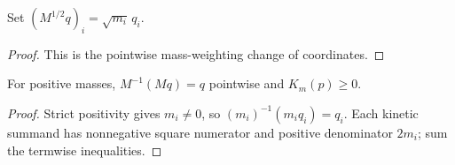 \begin{definition}
\label{def:mass:weighted-coordinate}
Set $(M^{1/2}q)_i=\sqrt{m_i}\,q_i$.
\end{definition}
\begin{proof}This is the pointwise mass-weighting change of coordinates.\end{proof}

\begin{theorem}
\label{thm:physics:mass_matrix:target}
For positive masses, $M^{-1}(Mq)=q$ pointwise and $K_m(p)\ge0$.
\end{theorem}
\begin{proof}
Strict positivity gives $m_i\ne0$, so $(m_i)^{-1}(m_iq_i)=q_i$. Each kinetic summand has nonnegative square numerator and positive denominator $2m_i$; sum the termwise inequalities.
\end{proof}

